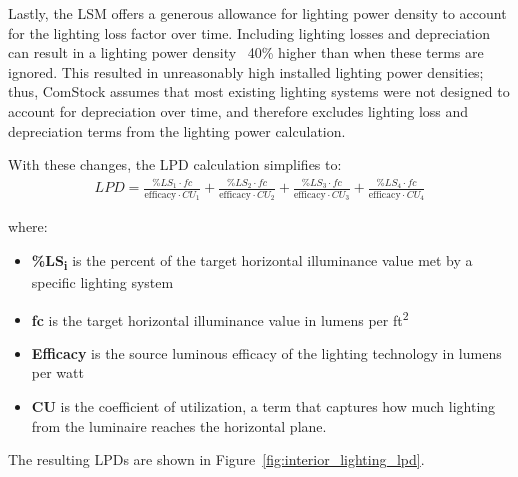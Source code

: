 Lastly, the LSM offers a generous allowance for lighting power density to account for the lighting loss factor over time. Including lighting losses and depreciation can result in a lighting power density ~40\% higher than when these terms are ignored. This resulted in unreasonably high installed lighting power densities; thus, ComStock assumes that most existing lighting systems were not designed to account for depreciation over time, and therefore excludes lighting loss and depreciation terms from the lighting power calculation.

With these changes, the LPD calculation simplifies to:
\begin{align}
\label{comstock_lpd_eqn}
LPD = \frac{\% LS_{1} \cdot fc}{\text{efficacy} \cdot CU_{1}} + \frac{\% LS_{2} \cdot fc}{\text{efficacy} \cdot CU_{2}} + \frac{\% LS_{3} \cdot fc}{\text{efficacy} \cdot CU_{3}} + \frac{\% LS_{4} \cdot fc}{\text{efficacy} \cdot CU_{4}}
\end{align}

where:\\
\begin{itemize}
\item \textbf{\%LS\textsubscript{i}} is the percent of the target horizontal illuminance value met by a specific lighting system\\
\item \textbf{fc} is the target horizontal illuminance value in lumens per ft\textsuperscript{2}\\
\item \textbf{Efficacy} is the source luminous efficacy of the lighting technology in lumens per watt\\
\item \textbf{CU} is the coefficient of utilization, a term that captures how much lighting from the luminaire reaches the horizontal plane.\\
\end{itemize}

The resulting LPDs are shown in Figure~\ref{fig:interior_lighting_lpd}.



